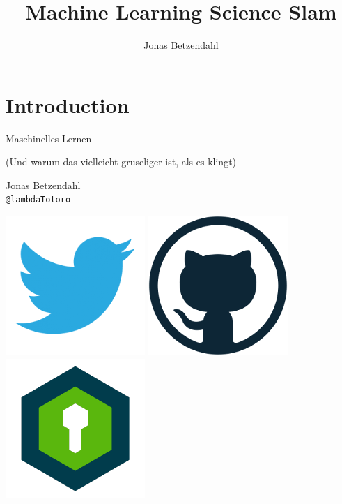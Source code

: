 \documentclass[aspectratio=169,x11names]{beamer}
\author{Jonas Betzendahl}
\title{Machine Learning Science Slam}
\begin{document}
\section{Introduction}

\begin{frame}
\begin{center}
\Large \glqq Maschinelles Lernen\grqq
\normalsize 

(Und warum das vielleicht gruseliger ist, als es klingt)
\bigskip\bigskip

\Large Jonas Betzendahl\\
\texttt{@lambdaTotoro}
\smallskip

\href{https://twitter.com/lambdatotoro}{\includegraphics[scale=0.125]{images/twitter_logo.png}}
\href{https://github.com/jbetzend}{\includegraphics[scale=0.125]{images/github_logo.png}}
\href{https://whispeer.de/en/user/jbetzend}{\includegraphics[scale=0.125]{images/whispeer_logo.png}}
\end{center}
\end{frame}
\end{document}
